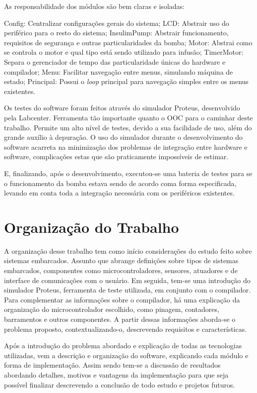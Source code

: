 As responsabilidade dos módulos são bem claras e isoladas:

Config: Centralizar configurações gerais do sistema;
LCD: Abstrair uso do periférico para o resto do sistema;
InsulimPump: Abstrair funcionamento, requisitos de segurança e outras particularidades da bomba;
Motor: Abstrai como se controla o motor e qual tipo está sendo utilizado para infusão;
TimerMotor: Separa o gerenciador de tempo das particularidade únicas do hardware e compilador;
Menu: Facilitar navegação entre menus, simulando máquina de estado;
Principal: Possui o \emph{loop} principal para navegação simples entre os menus existentes.

Os testes do software foram feitos através do simulador Proteus, desenvolvido pela Labcenter. Ferramenta tão importante quanto o OOC para o caminhar deste trabalho. Permite um alto nível de testes, devido a sua facilidade de uso, além do grande auxílio à depuração. O uso do simulador durante o desenvolvimento do software acarreta na minimização dos problemas de integração entre hardware e software, complicações estas que são praticamente impossíveis de estimar. 

E, finalizando, após o desenvolvimento, executou-se uma bateria de testes para se o funcionamento da bomba estava sendo de acordo coma forma especificada, levando em conta toda a integração necessária com os periféricos existentes.

\section{Organização do Trabalho}
A organização desse trabalho tem como início considerações do estudo feito sobre sistemas embarcados. Assunto que abrange definições sobre tipos de sistemas embarcados, componentes como microcontroladores, sensores, atuadores e de interface de comunicações com o usuário. Em seguida, tem-se uma introdução do simulador Proteus, ferramenta de teste utilizada, em conjunto com o compilador. Para complementar as informações sobre o compilador, há uma explicação da organização do microcontrolador escolhido, como pinagem, contadores, barramentos e outros componentes. A partir dessas informações aborda-se o problema proposto, contextualizando-o, descrevendo requisitos e características. 

Após a introdução do problema abordado e explicação de todas as tecnologias utilizadas, vem a descrição e organização do software, explicando cada módulo e forma de implementação. Assim sendo tem-se a discussão de resultados abordando detalhes, motivos e vantagens da implementação para que seja possível finalizar descrevendo a conclusão de todo estudo e projetos futuros.